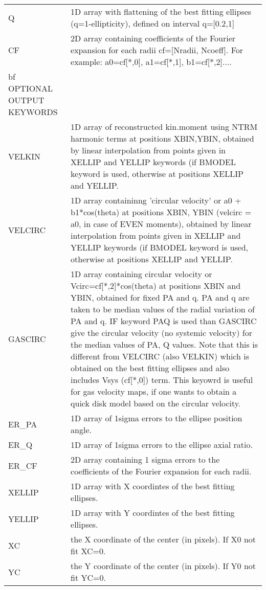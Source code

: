 \begin{center}
\begin{longtable}{p{2.7cm}| p{11.1cm}}
%
Q  & 1D array with flattening of the best fitting ellipses
            (q=1-ellipticity), defined on interval q=[0.2,1]\\
%
CF  & 2D array containing coefficients of the Fourier expansion
            for each radii cf=[Nradii, Ncoeff]. For example: 
	           a0=cf[*,0], a1=cf[*,1], b1=cf[*,2]....\\
\hline
{bf OPTIONAL OUTPUT KEYWORDS} & \\
\hline
VELKIN & 1D array of reconstructed kin.moment using NTRM harmonic
            terms at positions XBIN,YBIN, obtained by linear interpolation
	           from points given in XELLIP and YELLIP keywords (if BMODEL keyword
	           is used, otherwise at positions XELLIP and YELLIP.\\
%   
VELCIRC & 1D array containinng 'circular velocity' or a0 + b1*cos(theta)
            at positions XBIN, YBIN (velcirc = a0, in case of EVEN moments), 
	           obtained by linear interpolation from points given in XELLIP 
	           and YELLIP keywords (if BMODEL keyword is used, otherwise at 
	           positions XELLIP and YELLIP.\\
%
GASCIRC  &1D array containing circular velocity or Vcirc=cf[*,2]*cos(theta)
            at positions XBIN and YBIN, obtained for fixed PA and q. 
            PA and q are taken to be median values of the radial variation of PA and q. 
            IF keyword PAQ is used than GASCIRC give the circular velocity (no systemic
            velocity) for the median values of PA, Q values. Note that this is different
            from VELCIRC (also VELKIN) which is obtained on the best
            fitting ellipses and also includes Vsys (cf[*,0]) term. 
            This keyowrd is useful for gas velocity maps, if one wants to obtain 
            a quick disk model based on the circular velocity. \\
%
ER\_PA & 1D array of 1sigma errors to the ellipse position angle.\\
%
ER\_Q  &  1D array of 1sigma errors to the ellipse axial ratio.\\
%
ER\_CF  & 2D array containing 1 sigma errors to the coefficients 
	           of the Fourier expansion for each radii.\\

XELLIP & 1D array with X coordintes of the best fitting ellipses.\\
%
YELLIP & 1D array with Y coordintes of the best fitting ellipses.\\
%
XC    & the X coordinate of the center (in pixels). If X0 not fit XC=0.\\
%
YC    & the Y coordinate of the center (in pixels). If Y0 not fit YC=0.\\
\hline
\hline
\end{longtable}
\end{center}


